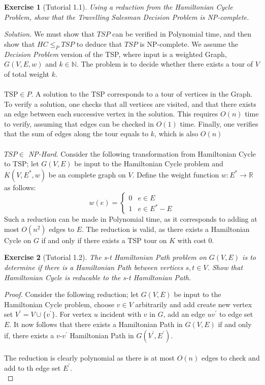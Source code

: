 \documentclass[a4paper,10pt]{article}
\newtheorem{exercise}{Exercise}
\begin{document}
\begin{exercise}[Tutorial 1.1]
    Using a reduction from the Hamiltonian Cycle Problem, show that the Travelling Salesman Decision Problem is NP-complete.
\end{exercise}
\textit{Solution.} We must show that $TSP$ can be verified in Polynomial time, and then show that $HC \leq_P TSP$ to deduce that $TSP$ is NP-complete. We assume the \textit{Decision Problem} version of the TSP, where input is a weighted Graph, $G(V,E,w)$ and $k\in\mathbb{N}$. The problem is to decide whether there exists a tour of $V$ of total weight $k$.  \\
\\
\textit{$\text{TSP}\in P$}. A solution to the TSP corresponds to a tour of vertices in the Graph. To verify a solution, one checks that all vertices are visited, and that there exists an edge between each successive vertex in the solution. This requires $O(n)$ time to verify, assuming that edges can be checked in $O(1)$ time. Finally, one verifies that the sum of edges along the tour equals to $k$, which is also $O(n)$\\
\\
\textit{$TSP\in$ NP-Hard}. Consider the following transformation from Hamiltonian Cycle to TSP; let $G(V,E)$ be input to the Hamiltonian Cycle problem and $K(V,E^*,w)$ be an complete graph on $V$. Define the weight function $w: E^*\rightarrow\mathbb{R}$ as follows: 
\[ w(e) = 
    \begin{cases} 
      0 & e \in E \\
      1 & e \in E^* - E
   \end{cases}
\]
Such a reduction can be made in Polynomial time, as it corresponds to adding at most $O(n^2)$ edges to $E$. The reduction is valid, as there exists a Hamiltonian Cycle on $G$ if and only if there exists a TSP tour on $K$ with cost 0.


\begin{exercise}[Tutorial 1.2] The s-t Hamiltonian Path problem on $G(V,E)$ is to determine if there is a Hamiltonian Path between vertices $s,t\in V$. Show that Hamiltonian Cycle is reducable to the s-t Hamiltonian Path. 
\end{exercise}
\begin{proof}
    Consider the following reduction; let $G(V,E)$ be input to the Hamiltonian Cycle problem, choose $v\in V$ arbitrarily and add create new vertex set $V^\prime = V \cup \{v^\prime\}$. For vertex $u$ incident with $v$ in $G$, add an edge $uv^\prime$ to edge set $E$. It now follows that there exists a Hamiltonian Path in $G(V,E)$ if and only if, there exists a $v$-$v^\prime$ Hamiltonian Path in $G(V^\prime, E^\prime)$. \\
    \\
    The reduction is clearly polynomial as there is at most $O(n)$ edges to check and add to th edge set $E^\prime$.\\
\end{proof}
\end{document}

